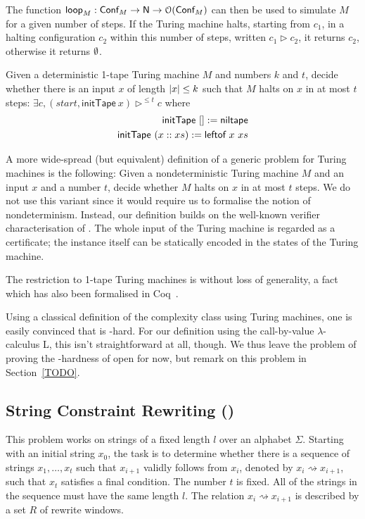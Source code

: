 \documentclass[a4paper,UKenglish,cleveref, autoref]{lipics-v2019}
\newcommand{\strent}{\rightsquigarrow}
\begin{document}
The function $\textsf{loop}_M : \textsf{Conf}_M \rightarrow \mathsf{N} \rightarrow \mathcal{O}{(\textsf{Conf}_M)}$ can then be used to simulate $M$ for a given number of steps. If the Turing machine halts, starting from $c_1$, in a halting configuration $c_2$ within this number of steps, written $c_1 \rhd c_2$, it returns $c_2$, otherwise it returns $\emptyset$.


\begin{definition}[\gennp{}]
  Given a deterministic 1-tape Turing machine $M$ and numbers $k$ and $t$, decide whether there is an input $x$ of length $|x| \le k$ such that $M$ halts on $x$ in at most $t$ steps: 
  $\exists c, (\mathit{start}, \textsf{initTape}~x) \rhd^{\le t} c$
  where 
  \begin{align*}
    \textsf{initTape}~[] := \textsf{niltape}\\
    \textsf{initTape}~(x :: xs) := \textsf{leftof}~x~xs
  \end{align*}
\end{definition}

A more wide-spread (but equivalent) definition of a generic problem for Turing machines is the following: Given a nondeterministic Turing machine $M$ and an input $x$ and a number $t$, decide whether $M$ halts on $x$ in at most $t$ steps. 
We do not use this variant since it would require us to formalise the notion of nondeterminism. Instead, our definition builds on the well-known verifier characterisation of \NP{}. The whole input of the Turing machine is regarded as a certificate; the instance itself can be statically encoded in the states of the Turing machine.

The restriction to 1-tape Turing machines is without loss of generality, a fact which has also been formalised in Coq~\cite{ForsterEtAl:2019:VerifiedTMs}. 

Using a classical definition of the complexity class \NP{} using Turing machines, one is easily convinced that \gennp{} is \NP{}-hard. For our definition using the call-by-value $\lambda$-calculus L, this isn't straightforward at all, though. We thus leave the problem of proving the \NP{}-hardness of \gennp{} open for now, but remark on this problem in Section~\ref{TODO}.

\subsection*{String Constraint Rewriting (\strconrew{})}
This problem works on strings of a fixed length $l$ over an alphabet $\Sigma$. Starting with an initial string $x_0$, the task is to determine whether there is a sequence of strings $x_1, \ldots, x_t$ such that $x_{i+1}$ validly follows from $x_i$, denoted by $x_i \strent x_{i+1}$, such that $x_t$ satisfies a final condition. The number $t$ is fixed. All of the strings in the sequence must have the same length $l$. The relation $x_i \strent x_{i+1}$ is described by a set $R$ of rewrite windows.
\end{document}
